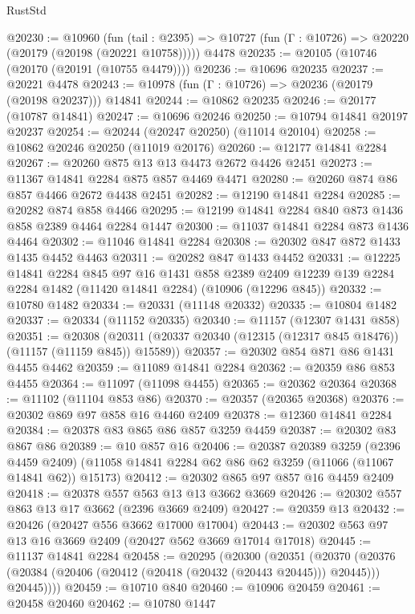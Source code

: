 \begin{lexlean}{RustStd}
\begin{coremodule}
@20230 := @10960
    (fun (tail : @2395) => @10727 (fun (Γ : @10726) => @20220 (@20179 (@20198 (@20221 @10758)))))
    @4478
@20235 := @20105 (@10746 (@20170 (@20191 (@10755 @4479))))
@20236 := @10696 @20235
@20237 := @20221 @4478
@20243 := @10978 (fun (Γ : @10726) => @20236 (@20179 (@20198 @20237))) @14841
@20244 := @10862 @20235
@20246 := @20177 (@10787 @14841)
@20247 := @10696 @20246
@20250 := @10794 @14841 @20197 @20237
@20254 := @20244 (@20247 @20250) (@11014 @20104)
@20258 := @10862 @20246 @20250 (@11019 @20176)
@20260 := @12177 @14841 @2284
@20267 := @20260 @875 @13 @13 @4473 @2672 @4426 @2451
@20273 := @11367 @14841 @2284 @875 @857 @4469 @4471
@20280 := @20260 @874 @86 @857 @4466 @2672 @4438 @2451
@20282 := @12190 @14841 @2284
@20285 := @20282 @874 @858 @4466
@20295 := @12199 @14841 @2284 @840 @873 @1436 @858 @2389 @4464 @2284 @1447
@20300 := @11037 @14841 @2284 @873 @1436 @4464
@20302 := @11046 @14841 @2284
@20308 := @20302 @847 @872 @1433 @1435 @4452 @4463
@20311 := @20282 @847 @1433 @4452
@20331 := @12225
    @14841
    @2284
    @845
    @97
    @16
    @1431
    @858
    @2389
    @2409
    @12239
    @139
    @2284
    @2284
    @1482
    (@11420 @14841 @2284)
    (@10906 (@12296 @845))
@20332 := @10780 @1482
@20334 := @20331 (@11148 @20332)
@20335 := @10804 @1482
@20337 := @20334 (@11152 @20335)
@20340 := @11157 (@12307 @1431 @858)
@20351 := @20308
    (@20311 (@20337 @20340 (@12315 (@12317 @845 @18476)) (@11157 (@11159 @845)) @15589))
@20357 := @20302 @854 @871 @86 @1431 @4455 @4462
@20359 := @11089 @14841 @2284
@20362 := @20359 @86 @853 @4455
@20364 := @11097 (@11098 @4455)
@20365 := @20362 @20364
@20368 := @11102 (@11104 @853 @86)
@20370 := @20357 (@20365 @20368)
@20376 := @20302 @869 @97 @858 @16 @4460 @2409
@20378 := @12360 @14841 @2284
@20384 := @20378 @83 @865 @86 @857 @3259 @4459
@20387 := @20302 @83 @867 @86
@20389 := @10 @857 @16
@20406 := @20387
    @20389
    @3259
    (@2396 @4459 @2409)
    (@11058 @14841 @2284 @62 @86 @62 @3259 (@11066 (@11067 @14841 @62)) @15173)
@20412 := @20302 @865 @97 @857 @16 @4459 @2409
@20418 := @20378 @557 @563 @13 @13 @3662 @3669
@20426 := @20302 @557 @863 @13 @17 @3662 (@2396 @3669 @2409)
@20427 := @20359 @13
@20432 := @20426 (@20427 @556 @3662 @17000 @17004)
@20443 := @20302 @563 @97 @13 @16 @3669 @2409 (@20427 @562 @3669 @17014 @17018)
@20445 := @11137 @14841 @2284
@20458 := @20295
    (@20300
      (@20351
        (@20370
          (@20376 (@20384 (@20406 (@20412 (@20418 (@20432 (@20443 @20445))) @20445))) @20445))))
@20459 := @10710 @840
@20460 := @10906 @20459
@20461 := @20458 @20460
@20462 := @10780 @1447

\end{coremodule}
\end{lexlean}

